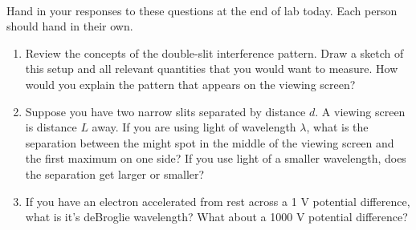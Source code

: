 \documentclass{tufte-handout}
\begin{document}



\vspace{0.5cm}
\\
\vspace{0.5cm}

Hand in your responses to these questions at the end of lab today. Each person should hand in their own.

\begin{enumerate}

\item Review the concepts of the double-slit interference pattern. Draw a sketch of this setup and
    all relevant quantities that you would want to measure. How would you explain the pattern that appears on the 
        viewing screen?

\item Suppose you have two narrow slits separated by distance $d$. A viewing screen is distance $L$ away. If you are
using light of wavelength $\lambda$, what is the separation between the might spot in the middle of
the viewing screen and the first maximum on one side? If you use light of a smaller wavelength, does
the separation get larger or smaller?

\item If you have an electron accelerated from rest across a 1 V potential difference, what is it's deBroglie wavelength? 
What about a 1000 V potential difference?

\end{enumerate}
\end{document}
